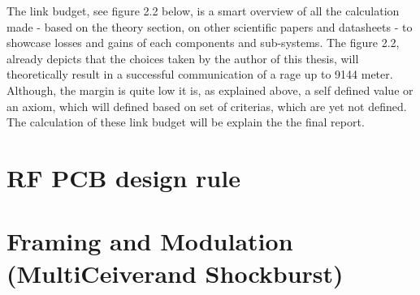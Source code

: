 The link budget, see figure 2.2 below, is a smart overview of all the calculation made - based on the theory section, on other scientific papers and datasheets - to showcase losses and gains of each components and sub-systems. The figure 2.2, already depicts that the choices taken by the author of this thesis, will theoretically result in a successful communication of a rage up to 9144 meter. Although, the margin is quite low it is, as explained above, a self defined value or an axiom, which will defined based on set of criterias, which are yet not defined. The calculation of these link budget will be explain the the final report. 

\section{RF PCB design rule}
\section{Framing and Modulation (MultiCeiver\texttrademark and Shockburst\texttrademark)}


